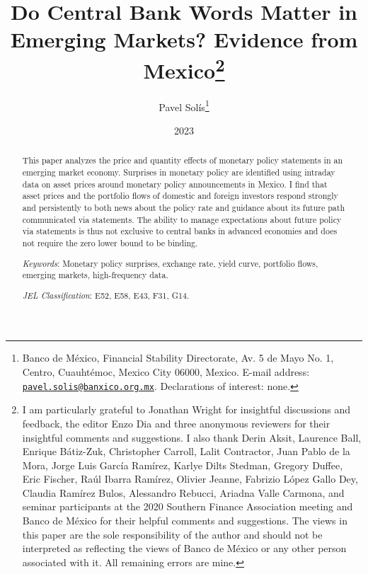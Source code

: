\documentclass[a4paper, 12pt]{article}
\begin{document}
\title{Do Central Bank Words Matter in Emerging Markets? Evidence from Mexico\thanks{\protect\linespread{1}\protect\selectfont I am particularly grateful to Jonathan Wright for insightful discussions and feedback, the editor Enzo Dia and three anonymous reviewers for their insightful comments and suggestions. I also thank Derin Aksit, Laurence Ball, Enrique Bátiz-Zuk, Christopher Carroll, Lalit Contractor, Juan Pablo de la Mora, Jorge Luis García Ramírez, Karlye Dilts Stedman, Gregory Duffee, Eric Fischer, Raúl Ibarra Ramírez, Olivier Jeanne, Fabrizio López Gallo Dey, Claudia Ramírez Bulos, Alessandro Rebucci, Ariadna Valle Carmona, and seminar participants at the 2020 Southern Finance Association meeting and Banco de México for their helpful comments and suggestions. The views in this paper are the sole responsibility of the author and should not be interpreted as reflecting the views of Banco de México or any other person associated with it. All remaining errors are mine.}
}
\author{Pavel Solís\thanks{\protect\linespread{1}\protect\selectfont Banco de México, Financial Stability Directorate, Av. 5 de Mayo No. 1, Centro, Cuauhtémoc, Mexico City 06000, Mexico. E-mail address: \href{mailto:pavel.solis@banxico.org.mx}{\texttt{pavel.solis@banxico.org.mx}}. Declarations of interest: none.}
}
\date{2023}

\maketitle	\vspace{-4ex}

\begin{abstract}
	This paper analyzes the price and quantity effects of monetary policy statements in an emerging market economy. Surprises in monetary policy are identified using intraday data on asset prices around monetary policy announcements in Mexico. I find that asset prices and the portfolio flows of domestic and foreign investors respond strongly and persistently to both news about the policy rate and guidance about its future path communicated via statements. The ability to manage expectations about future policy via statements is thus not exclusive to central banks in advanced economies and does not require the zero lower bound to be binding. 
	
	\vspace{.5cm}
	\noindent \textit{Keywords}: Monetary policy surprises, exchange rate, yield curve, portfolio flows, emerging markets, high-frequency data.
	
	\noindent \textit{JEL Classification}: E52, E58, E43, F31, G14. 
	\vfill
	
	\pagebreak
\end{abstract}
\end{document}
